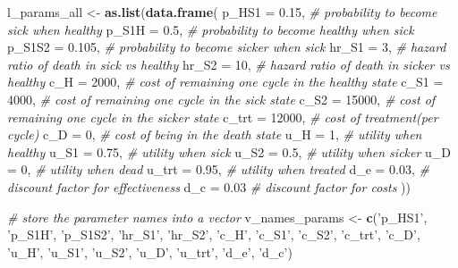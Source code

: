 \documentclass[
]{article}
\newenvironment{Shaded}{\begin{snugshade}}{\end{snugshade}}
\newcommand{\CommentTok}[1]{\textcolor[rgb]{0.56,0.35,0.01}{\textit{#1}}}
\newcommand{\DataTypeTok}[1]{\textcolor[rgb]{0.13,0.29,0.53}{#1}}
\newcommand{\DecValTok}[1]{\textcolor[rgb]{0.00,0.00,0.81}{#1}}
\newcommand{\FloatTok}[1]{\textcolor[rgb]{0.00,0.00,0.81}{#1}}
\newcommand{\KeywordTok}[1]{\textcolor[rgb]{0.13,0.29,0.53}{\textbf{#1}}}
\newcommand{\NormalTok}[1]{#1}
\newcommand{\StringTok}[1]{\textcolor[rgb]{0.31,0.60,0.02}{#1}}
\begin{document}
\begin{Shaded}
\begin{Highlighting}[]
\NormalTok{l_params_all <-}\StringTok{ }\KeywordTok{as.list}\NormalTok{(}\KeywordTok{data.frame}\NormalTok{(}
  \DataTypeTok{p_HS1   =} \FloatTok{0.15}\NormalTok{,                }\CommentTok{# probability to become sick when healthy}
  \DataTypeTok{p_S1H   =} \FloatTok{0.5}\NormalTok{,               }\CommentTok{# probability to become healthy when sick}
  \DataTypeTok{p_S1S2  =} \FloatTok{0.105}\NormalTok{,             }\CommentTok{# probability to become sicker when sick}
  \DataTypeTok{hr_S1   =} \DecValTok{3}\NormalTok{,                 }\CommentTok{# hazard ratio of death in sick vs healthy}
  \DataTypeTok{hr_S2   =} \DecValTok{10}\NormalTok{,                }\CommentTok{# hazard ratio of death in sicker vs healthy}
  \DataTypeTok{c_H     =} \DecValTok{2000}\NormalTok{,              }\CommentTok{# cost of remaining one cycle in the healthy state}
  \DataTypeTok{c_S1    =} \DecValTok{4000}\NormalTok{,              }\CommentTok{# cost of remaining one cycle in the sick state}
  \DataTypeTok{c_S2    =} \DecValTok{15000}\NormalTok{,             }\CommentTok{# cost of remaining one cycle in the sicker state}
  \DataTypeTok{c_trt   =} \DecValTok{12000}\NormalTok{,             }\CommentTok{# cost of treatment(per cycle)}
  \DataTypeTok{c_D     =} \DecValTok{0}\NormalTok{,                 }\CommentTok{# cost of being in the death state}
  \DataTypeTok{u_H     =} \DecValTok{1}\NormalTok{,                 }\CommentTok{# utility when healthy}
  \DataTypeTok{u_S1    =} \FloatTok{0.75}\NormalTok{,              }\CommentTok{# utility when sick}
  \DataTypeTok{u_S2    =} \FloatTok{0.5}\NormalTok{,               }\CommentTok{# utility when sicker}
  \DataTypeTok{u_D     =} \DecValTok{0}\NormalTok{,                 }\CommentTok{# utility when dead}
  \DataTypeTok{u_trt   =} \FloatTok{0.95}\NormalTok{,              }\CommentTok{# utility when treated}
  \DataTypeTok{d_e    =} \FloatTok{0.03}\NormalTok{,               }\CommentTok{# discount factor for effectiveness}
  \DataTypeTok{d_c    =} \FloatTok{0.03}                \CommentTok{# discount factor for costs}
\NormalTok{))}

\CommentTok{# store the parameter names into a vector}
\NormalTok{v_names_params <-}\StringTok{ }\KeywordTok{c}\NormalTok{(}\StringTok{'p_HS1'}\NormalTok{, }\StringTok{'p_S1H'}\NormalTok{, }\StringTok{'p_S1S2'}\NormalTok{, }\StringTok{'hr_S1'}\NormalTok{, }\StringTok{'hr_S2'}\NormalTok{, }\StringTok{'c_H'}\NormalTok{, }\StringTok{'c_S1'}\NormalTok{, }\StringTok{'c_S2'}\NormalTok{, }\StringTok{'c_trt'}\NormalTok{, }\StringTok{'c_D'}\NormalTok{, }\StringTok{'u_H'}\NormalTok{, }\StringTok{'u_S1'}\NormalTok{,  }
                    \StringTok{'u_S2'}\NormalTok{, }\StringTok{'u_D'}\NormalTok{, }\StringTok{'u_trt'}\NormalTok{, }\StringTok{'d_e'}\NormalTok{, }\StringTok{'d_c'}\NormalTok{)}
\end{Highlighting}
\end{Shaded}
\end{document}
